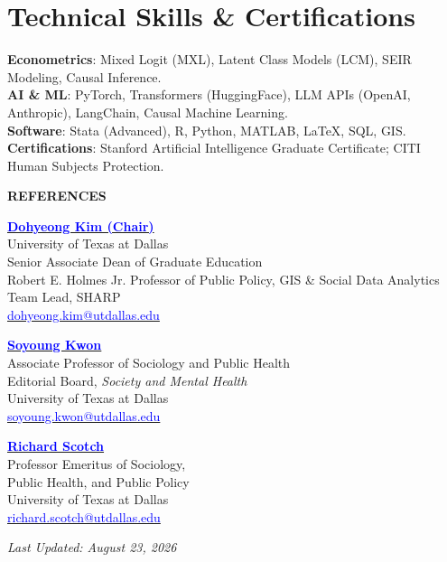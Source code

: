 \documentclass[11pt, letterpaper]{article}
\begin{document}
\section*{Technical Skills \& Certifications}
\textbf{Econometrics}: Mixed Logit (MXL), Latent Class Models (LCM), SEIR Modeling, Causal Inference. \\
\textbf{AI \& ML}: PyTorch, Transformers (HuggingFace), LLM APIs (OpenAI, Anthropic), LangChain, Causal Machine Learning. \\
\textbf{Software}: Stata (Advanced), R, Python, MATLAB, LaTeX, SQL, GIS. \\
\textbf{Certifications}: Stanford Artificial Intelligence Graduate Certificate; CITI Human Subjects Protection.

\vspace{1em}
\noindent\hrulefill
\begin{center}
    \textbf{REFERENCES}
\end{center}

\begin{minipage}[t]{0.48\textwidth}
    \raggedright
    \textbf{\href{https://profiles.utdallas.edu/dohyeong.kim}{\textcolor{blue}{Dohyeong Kim (Chair)}}} \\
    University of Texas at Dallas \\
    Senior Associate Dean of Graduate Education \\
    Robert E. Holmes Jr. Professor of Public Policy, GIS \& Social Data Analytics \\
    Team Lead, SHARP \\
    \href{mailto:dohyeong.kim@utdallas.edu}{\textcolor{blue}{dohyeong.kim@utdallas.edu}}
\end{minipage}
\hfill
\begin{minipage}[t]{0.48\textwidth}
    \raggedright
    \textbf{\href{https://profiles.utdallas.edu/soyoung.kwon}{\textcolor{blue}{Soyoung Kwon}}} \\
    Associate Professor of Sociology and Public Health \\
    Editorial Board, \textit{Society and Mental Health} \\
    University of Texas at Dallas \\
    \href{mailto:soyoung.kwon@utdallas.edu}{\textcolor{blue}{soyoung.kwon@utdallas.edu}}
\end{minipage}

\vspace{1.5em}

\begin{minipage}[t]{0.48\textwidth}
    \raggedright
    \textbf{\href{https://profiles.utdallas.edu/richard.scotch}{\textcolor{blue}{Richard Scotch}}} \\
    Professor Emeritus of Sociology, \\
    Public Health, and Public Policy \\
    University of Texas at Dallas \\
    \href{mailto:richard.scotch@utdallas.edu}{\textcolor{blue}{richard.scotch@utdallas.edu}}
\end{minipage}

\vspace{1em}
\begin{center}
    \textit{Last Updated: August 23, 2026}
\end{center}
\end{document}
